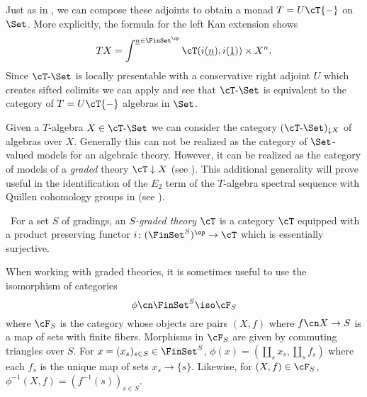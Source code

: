 \documentclass[leqno,oneside,english]{elsarticle}
\begin{document}
Just as in , we can compose these adjoints to obtain a
monad $T=U\cT\{-\}$ on $\Set$. More explicitly, the formula for the left Kan
extension shows
\begin{equation}\label{eqn:monad-associated-to-a-theory}
  TX = \int^{\underline{n}\in\FinSet^{\op}} \cT(i(\underline{n}),i(\underline{1}))\times X^{n}.
\end{equation}
Since ${{\cT}\text{-}{\Set}}$ is locally presentable with a conservative right adjoint $U$ which 
creates sifted colimits we can apply
 and see that
${{\cT}\text{-}{\Set}}$ is equivalent to the category of $T=U\cT\{-\}$
algebras in $\Set$.  
{{\ifshowsaveblocks
{}
\fi}}{}

Given a $T$-algebra $X\in {{\cT}\text{-}{\Set}}$ we can consider the
category $({{\cT}\text{-}{\Set}})_{\downarrow X}$ of algebras over
$X$. Generally this can not be realized as the category of
$\Set$-valued models for an algebraic theory. However, it can be
realized as the category of models of a \emph{graded} theory
$\cT\downarrow X$ (see ). This additional generality will prove useful in the identification of the $E_2$ term of the $T$-algebra spectral sequence with Quillen
cohomology groups in  (see ).

\begin{defn}\ 
  For a set $S$ of gradings, an \emph{$S$-graded theory} $\cT$ is a category
  $\cT$ equipped with a product preserving functor
  $i\colon(\FinSet^{S})^{\op}\rightarrow \cT$ which is essentially
  surjective.
\end{defn}

When working with graded theories, it is sometimes useful to use the isomorphism of categories 
\[
\phi\cn\FinSet^S \iso \cF_S
\]
where $\cF_S$ is the category whose objects are pairs $(X,f)$ where
$f\cn X \to S$ is a map of sets with finite fibers.
Morphisms in $\cF_S$ are given by commuting triangles over $S$. For $x
= (x_s)_{s \in S} \in \FinSet^S$, $\phi(x) = (\coprod_s x_s,
\coprod_sf_s)$ where each $f_s$ is the unique map of sets $x_s \to
\{s\}$.  Likewise, for $(X,f) \in \cF_S$, $\phi^{-1}(X,f) =
(f^{-1}(s))_{s \in S}$.
\end{document}
